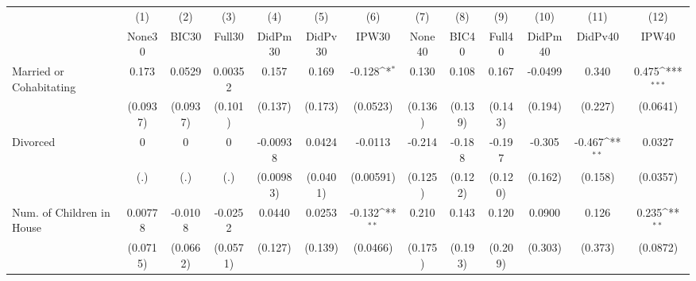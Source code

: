 {
\def\sym#1{\ifmmode^{#1}\else\(^{#1}\)\fi}
\begin{tabular}{l*{12}{c}}
\toprule
            &\multicolumn{1}{c}{(1)}&\multicolumn{1}{c}{(2)}&\multicolumn{1}{c}{(3)}&\multicolumn{1}{c}{(4)}&\multicolumn{1}{c}{(5)}&\multicolumn{1}{c}{(6)}&\multicolumn{1}{c}{(7)}&\multicolumn{1}{c}{(8)}&\multicolumn{1}{c}{(9)}&\multicolumn{1}{c}{(10)}&\multicolumn{1}{c}{(11)}&\multicolumn{1}{c}{(12)}\\
            &\multicolumn{1}{c}{None30}&\multicolumn{1}{c}{BIC30}&\multicolumn{1}{c}{Full30}&\multicolumn{1}{c}{DidPm30}&\multicolumn{1}{c}{DidPv30}&\multicolumn{1}{c}{IPW30}&\multicolumn{1}{c}{None40}&\multicolumn{1}{c}{BIC40}&\multicolumn{1}{c}{Full40}&\multicolumn{1}{c}{DidPm40}&\multicolumn{1}{c}{DidPv40}&\multicolumn{1}{c}{IPW40}\\
\midrule
Married or Cohabitating&       0.173         &      0.0529         &     0.00352         &       0.157         &       0.169         &      -0.128\sym{*}  &       0.130         &       0.108         &       0.167         &     -0.0499         &       0.340         &       0.475\sym{***}\\
            &    (0.0937)         &    (0.0937)         &     (0.101)         &     (0.137)         &     (0.173)         &    (0.0523)         &     (0.136)         &     (0.139)         &     (0.143)         &     (0.194)         &     (0.227)         &    (0.0641)         \\
\addlinespace
Divorced    &           0         &           0         &           0         &    -0.00938         &      0.0424         &     -0.0113         &      -0.214         &      -0.188         &      -0.197         &      -0.305         &      -0.467\sym{**} &      0.0327         \\
            &         (.)         &         (.)         &         (.)         &   (0.00983)         &    (0.0401)         &   (0.00591)         &     (0.125)         &     (0.122)         &     (0.120)         &     (0.162)         &     (0.158)         &    (0.0357)         \\
\addlinespace
Num. of Children in House&     0.00778         &     -0.0108         &     -0.0252         &      0.0440         &      0.0253         &      -0.132\sym{**} &       0.210         &       0.143         &       0.120         &      0.0900         &       0.126         &       0.235\sym{**} \\
            &    (0.0715)         &    (0.0662)         &    (0.0571)         &     (0.127)         &     (0.139)         &    (0.0466)         &     (0.175)         &     (0.193)         &     (0.209)         &     (0.303)         &     (0.373)         &    (0.0872)         \\

\end{tabular}}
